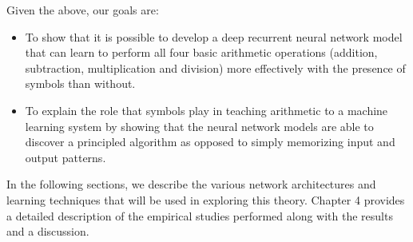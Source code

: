 Given the above, our goals are:
\begin{itemize}
	\item To show that it is possible to develop a deep recurrent neural network model that can learn to perform all four basic arithmetic operations (addition, subtraction, multiplication and division) more effectively with the presence of symbols than without.
	\item To explain the role that symbols play in teaching arithmetic to a machine learning system by showing that the neural network models are able to discover a principled algorithm as opposed to simply memorizing input and output patterns.
\end{itemize}

In the following sections, we describe the various network architectures and learning techniques that will be used in exploring this theory. Chapter 4 provides a detailed description of the empirical studies performed along with the results and a discussion.





